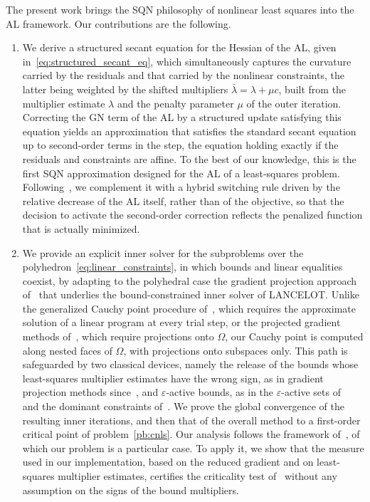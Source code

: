 \documentclass[pdflatex,sn-mathphys-num]{sn-jnl}%
\theoremstyle{thmstyleone}%
\newcommand{\rev}[1]{#1}
\begin{document}
The present work brings the SQN philosophy of nonlinear least squares into the AL framework. Our contributions are the following.
\begin{enumerate}[label=(\roman*), leftmargin=*, itemsep=2pt]
	\item We derive a structured secant equation for the Hessian of the AL, given in~\eqref{eq:structured_secant_eq}, which simultaneously captures the curvature carried by the residuals and that carried by the nonlinear constraints, the latter being weighted by the shifted multipliers $\bar{\lambda} = \lambda + \mu c$, built from the multiplier estimate $\lambda$ and the penalty parameter $\mu$ of the outer iteration. Correcting the GN term of the AL by a structured update satisfying this equation yields an approximation that satisfies the standard secant equation up to second-order terms in the step, the equation holding exactly if the residuals and constraints are affine. To the best of our knowledge, this is the first SQN approximation designed for the AL of a least-squares problem. Following~\cite{tjoabiegler:1991}, we complement it with a hybrid switching rule driven by the relative decrease of the AL itself, rather than of the objective, so that the decision to activate the second-order correction reflects the penalized function that is actually minimized.
	\item We provide an explicit inner solver for the subproblems over the polyhedron~\eqref{eq:linear_constraints}, in which bounds and linear equalities coexist, by adapting to the polyhedral case the gradient projection approach of~\cite{conn-etal:1988b} that underlies the bound-constrained inner solver of LANCELOT. Unlike the generalized Cauchy point procedure of~\cite{conn-etal:1993}, which requires the approximate solution of a linear program at every trial step, or the projected gradient methods of~\cite{calamaimore:1987}, which require projections onto $\Omega$, our Cauchy point is computed along nested faces of $\Omega$, with projections onto subspaces only. This path is safeguarded by two classical devices, namely the release of the bounds whose least-squares multiplier estimates have the wrong sign, as in gradient projection methods since~\cite{rosen:1960}, and $\varepsilon$-active bounds, as in the $\varepsilon$-active sets of~\cite{zoutendijk:1960,topkisveinott:1967,bertsekas:1982} and the dominant constraints of~\cite{conn-etal:1996b}. We prove the global convergence of the resulting inner iterations, and then that of the overall method to a first-order critical point of problem~\eqref{pb:cnls}. Our analysis follows the framework of~\cite{conn-etal:1996b}, of which our problem is a particular case\rev{. To apply it}, we show that the measure used in our implementation, based on the reduced gradient and on least-squares multiplier estimates, certifies the criticality test of~\cite{conn-etal:1996b} \rev{without any assumption on the signs of the bound multipliers}.

\end{enumerate}
\end{document}
